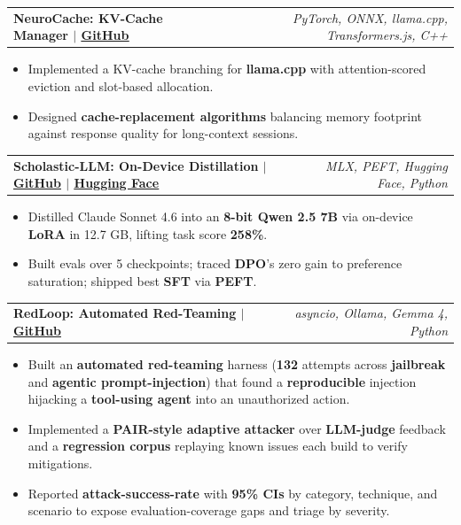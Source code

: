 \documentclass[letterpaper,10pt]{article}
\makeatletter
\newcommand{\resumeItem}[1]{\item\small{{#1}}}
\newcommand{\resumeProjectHeading}[2]{
  \vspace{1pt}\item
    \begin{tabular*}{0.97\textwidth}[t]{l@{\extracolsep{\fill}}r}
      \textbf{#1} & \textit{\small #2} \\
    \end{tabular*}\vspace{-3pt}
}
\newcommand{\resumeItemListStart}{
  \begin{itemize}[leftmargin=0.25in]
}
\newcommand{\resumeItemListEnd}{
  \end{itemize}\vspace{-3pt}
}
\makeatother
\begin{document}
      \vspace{5pt}

    \resumeProjectHeading
      {NeuroCache: KV-Cache Manager $|$ \textnormal{\small \href{https://github.com/pleyva2004/context-control-kv-cache}{\underline{GitHub}}}}{PyTorch, ONNX, llama.cpp, Transformers.js, C++}


      \vspace{3pt}


      \resumeItemListStart
        \resumeItem{Implemented a KV-cache branching for \textbf{llama.cpp} with attention-scored eviction and slot-based allocation.}
        \resumeItem{Designed \textbf{cache-replacement algorithms} balancing memory footprint against response quality for long-context sessions.}
      \resumeItemListEnd

      \vspace{5pt}

    \resumeProjectHeading
      {Scholastic-LLM: On-Device Distillation $|$ \textnormal{\small \href{https://github.com/pleyva2004/scholastic-llm}{\underline{GitHub}} $|$ \href{https://huggingface.co/spaces/pleyva2004/scholastic-llm-demo}{\underline{Hugging Face}}}}{MLX, PEFT, Hugging Face, Python}

      \vspace{3pt}

      \resumeItemListStart
        \resumeItem{Distilled Claude Sonnet 4.6 into an \textbf{8-bit Qwen 2.5 7B} via on-device \textbf{LoRA} in 12.7 GB, lifting task score \textbf{258\%}.}
        \resumeItem{Built evals over 5 checkpoints; traced \textbf{DPO}'s zero gain to preference saturation; shipped best \textbf{SFT} via \textbf{PEFT}.}
      \resumeItemListEnd

       \vspace{5pt}

    \resumeProjectHeading
      {RedLoop: Automated Red-Teaming $|$ \textnormal{\small \href{https://github.com/pleyva2004/redloop}{\underline{GitHub}}}}{asyncio, Ollama, Gemma 4, Python}


      \vspace{3pt}


      \resumeItemListStart
        \resumeItem{Built an \textbf{automated red-teaming} harness (\textbf{132} attempts across \textbf{jailbreak} and \textbf{agentic prompt-injection}) that found a \textbf{reproducible} injection hijacking a \textbf{tool-using agent} into an unauthorized action.}
        \resumeItem{Implemented a \textbf{PAIR-style adaptive attacker} over \textbf{LLM-judge} feedback and a \textbf{regression corpus} replaying known issues each build to verify mitigations.}
        \resumeItem{Reported \textbf{attack-success-rate} with \textbf{95\% CIs} by category, technique, and scenario to expose evaluation-coverage gaps and triage by severity.}
      \resumeItemListEnd
      
\end{document}
